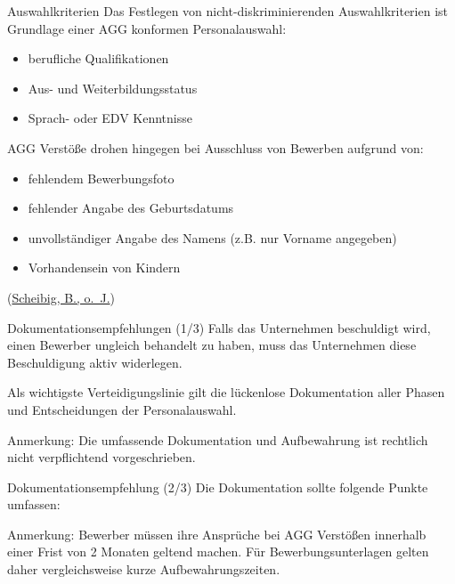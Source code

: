 \documentclass[
  10pt,
  ngerman,
  ignorenonframetext,
]{beamer}
\providecommand{\tightlist}{%
  \setlength{\itemsep}{0pt}\setlength{\parskip}{0pt}}
\begin{document}
\begin{frame}{Auswahlkriterien}
\protect\hypertarget{auswahlkriterien}{}
Das Festlegen von nicht-diskriminierenden Auswahlkriterien ist Grundlage
einer AGG konformen Personalauswahl:

\begin{itemize}
\tightlist
\item
  berufliche Qualifikationen
\item
  Aus- und Weiterbildungsstatus
\item
  Sprach- oder EDV Kenntnisse
\end{itemize}

AGG Verstöße drohen hingegen bei Ausschluss von Bewerben aufgrund von:

\begin{itemize}
\tightlist
\item
  fehlendem Bewerbungsfoto
\item
  fehlender Angabe des Geburtsdatums
\item
  unvollständiger Angabe des Namens (z.B. nur Vorname angegeben)
\item
  Vorhandensein von Kindern
\end{itemize}

(\protect\hyperlink{ref-ihk_wsb}{Scheibig, B., o.~J.})
\end{frame}

\begin{frame}{Dokumentationsempfehlungen (1/3)}
\protect\hypertarget{dokumentationsempfehlungen-13}{}
Falls das Unternehmen beschuldigt wird, einen Bewerber ungleich
behandelt zu haben, muss das Unternehmen diese Beschuldigung aktiv
widerlegen.

Als wichtigste Verteidigungslinie gilt die lückenlose Dokumentation
aller Phasen und Entscheidungen der Personalauswahl.

Anmerkung: Die umfassende Dokumentation und Aufbewahrung ist rechtlich
nicht verpflichtend vorgeschrieben.
\end{frame}

\begin{frame}{Dokumentationsempfehlung (2/3)}
\protect\hypertarget{dokumentationsempfehlung-23}{}
Die Dokumentation sollte folgende Punkte umfassen:


Anmerkung: Bewerber müssen ihre Ansprüche bei AGG Verstößen innerhalb
einer Frist von 2 Monaten geltend machen. Für Bewerbungsunterlagen
gelten daher vergleichsweise kurze Aufbewahrungszeiten.
\end{frame}
\end{document}
